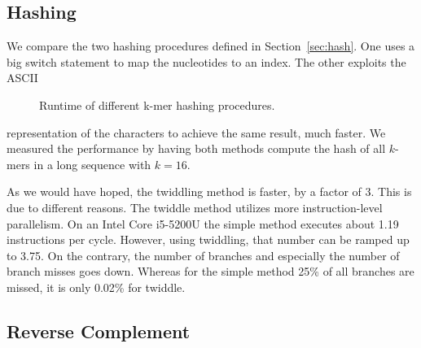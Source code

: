 \documentclass[10pt,letterpaper]{article}
\begin{document}
\vspace*{2cm}
\newpage{}
\subsection{Hashing}

We compare the two hashing procedures defined in Section~\ref{sec:hash}. One uses a big switch statement to map the nucleotides to an index. The other exploits the ASCII 

\begin{wrapfigure}[16]{r}{65mm}
    \caption{Runtime of different k-mer hashing procedures.}
\end{wrapfigure}
\noindent representation of the characters to achieve the same result, much faster. We measured the performance by having both methods compute the hash of all $k$-mers in a long sequence with $k = 16$.

As we would have hoped, the twiddling method is faster, by a factor of 3. This is due to different reasons. The twiddle method utilizes more instruction-level parallelism. On an Intel Core i5-5200U the simple method executes about 1.19 instructions per cycle. However, using twiddling, that number can be ramped up to 3.75. On the contrary, the number of branches and especially the number of branch misses goes down. Whereas for the simple method 25\% of all branches are missed, it is only 0.02\% for twiddle.


\subsection{Reverse Complement}
\end{document}
